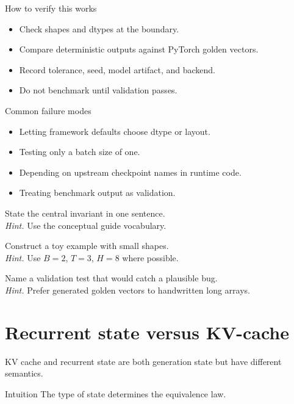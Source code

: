 \begin{verificationbox}{How to verify this works}
\begin{itemize}
\item Check shapes and dtypes at the boundary.
\item Compare deterministic outputs against PyTorch golden vectors.
\item Record tolerance, seed, model artifact, and backend.
\item Do not benchmark until validation passes.
\end{itemize}
\end{verificationbox}

\begin{warningbox}{Common failure modes}
\begin{itemize}
\item Letting framework defaults choose dtype or layout.
\item Testing only a batch size of one.
\item Depending on upstream checkpoint names in runtime code.
\item Treating benchmark output as validation.
\end{itemize}
\end{warningbox}

\begin{chapterexercises}
\item State the central invariant in one sentence.\\
\textit{Hint.} Use the conceptual guide vocabulary.
\item Construct a toy example with small shapes.\\
\textit{Hint.} Use $B=2$, $T=3$, $H=8$ where possible.
\item Name a validation test that would catch a plausible bug.\\
\textit{Hint.} Prefer generated golden vectors to handwritten long arrays.
\end{chapterexercises}

\chapter{Recurrent state versus KV-cache}
\label{ch:state-vs-cache}
KV cache and recurrent state are both generation state but have different semantics.



\begin{intuitionbox}{Intuition}
The type of state determines the equivalence law.
\end{intuitionbox}

